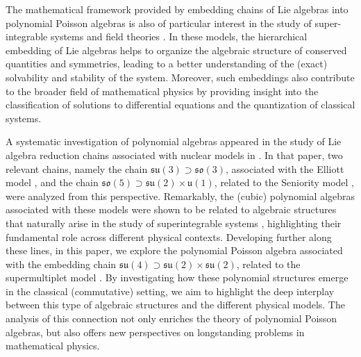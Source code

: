 \documentclass[10pt]{amsart}
\theoremstyle{definition}
\theoremstyle{corollary}
\theoremstyle{remark}
\theoremstyle{conclusion}
\begin{document}
The mathematical framework provided by embedding chains of Lie algebras into polynomial Poisson algebras is also of particular interest in the study of super-integrable systems and field theories \cite{CampoamorStursberg2021,MR4660510}. In these models, the hierarchical embedding of Lie algebras helps to organize the algebraic structure of conserved quantities and symmetries, leading to a better understanding of the (exact) solvability and stability of the system. Moreover,  such embeddings also contribute to the broader field of mathematical physics by providing insight into the classification of solutions to differential equations and the quantization of classical systems.

 A systematic investigation of polynomial algebras appeared in the study of Lie algebra reduction chains associated with nuclear models in \cite{MR4660510}. In that paper, two relevant chains, namely the chain $\mathfrak{su}(3) \supset \mathfrak{so}(3)$, associated with the Elliott model \cite{elliott1,elliott2}, and the chain $\mathfrak{so}(5) \supset \mathfrak{su}(2) \times \mathfrak{u}(1)$, related to the Seniority model \cite{Helmers61, Racah1965,Hecht65, HS70}, were analyzed from this perspective. Remarkably, the (cubic) polynomial algebras associated with these models were shown to be related to algebraic structures that naturally arise in the study of superintegrable systems \cite{MR1814439}, highlighting their fundamental role across different physical contexts. Developing further along these lines, in this paper, we explore the polynomial Poisson algebra associated with the embedding chain $\mathfrak{su}(4) \supset \mathfrak{su}(2) \times \mathfrak{su}(2)$, related to the supermultiplet model \cite{Wig, MR189602, Hecht, Brunet, Draayer, MR1296410}. By investigating how these  polynomial structures emerge in the classical (commutative) setting, we aim to highlight the deep interplay between this type of algebraic structures and the different physical models. The analysis of this connection not only enriches the theory of polynomial Poisson algebras, but also offers new perspectives on longstanding problems in mathematical physics.
\end{document}
